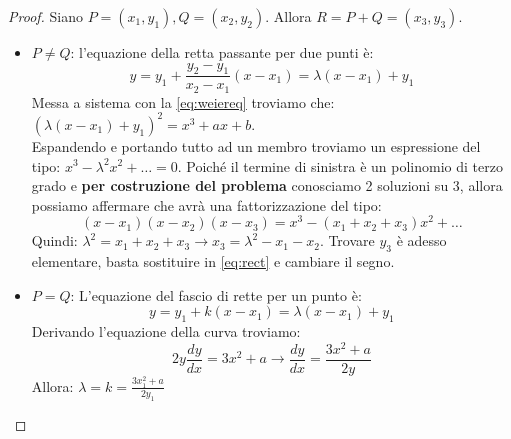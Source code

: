 \begin{proof}
Siano $P=(x_1,y_1),Q=(x_2,y_2)$. Allora $R=P+Q=(x_3,y_3)$.
\begin{itemize}
    \item $P\ne Q$: l'equazione della retta passante per due punti è:
    \begin{equation}\label{eq:rect}
    y=y_1+\frac{y_2-y_1}{x_2-x_1}(x-x_1)=\lambda(x-x_1)+y_1    
    \end{equation}
    Messa a sistema con la \cref{eq:weiereq} troviamo che: $(\lambda(x-x_1)+y_1)^2=x^3+ax+b$.\\
    Espandendo e portando tutto ad un membro troviamo un espressione del tipo: $x^3-\lambda^2x^2+\dots=0$.
    Poiché il termine di sinistra è un polinomio di terzo grado e \textbf{per costruzione del problema} conosciamo 2 soluzioni su 3, allora possiamo affermare che avrà una fattorizzazione del tipo: 
    \[(x-x_1)(x-x_2)(x-x_3)=x^3-(x_1+x_2+x_3)x^2+\dots
    \]
    Quindi: $\lambda^2=x_1+x_2+x_3\longrightarrow x_3=\lambda^2-x_1-x_2$. Trovare $y_3$ è adesso elementare, basta sostituire in \cref{eq:rect} e cambiare il segno.
    \item $P=Q$: L'equazione del fascio di rette per un punto è:
    \begin{equation}\label{eq:rectspan}
        y=y_1+k(x-x_1)=\lambda(x-x_1)+y_1
    \end{equation}
    Derivando l'equazione della curva troviamo:
    \[
    2y\frac{dy}{dx}=3x^2+a\longrightarrow\frac{dy}{dx}=\frac{3x^2+a}{2y}
    \]
    Allora: $\lambda=k=\frac{3x_1^2+a}{2y_1}$
\end{itemize}
\end{proof}
